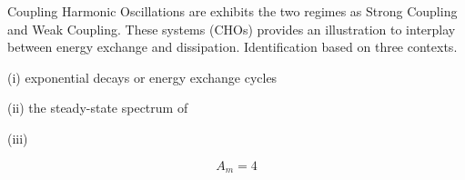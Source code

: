 
Coupling Harmonic Oscillations are exhibits the two regimes as Strong Coupling and Weak Coupling. These systems (CHOs)	provides an illustration to interplay between energy exchange and dissipation. Identification based on three contexts.

(i) exponential decays or energy exchange cycles

(ii) the steady-state spectrum of 

(iii)	

\begin{equation}
	A_m = 4
\end{equation}
